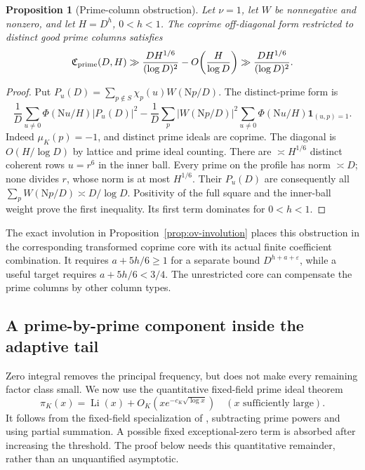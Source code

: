 \documentclass[11pt]{article}
\numberwithin{equation}{section}
\newtheorem{proposition}[theorem]{Proposition}
\theoremstyle{definition}
\theoremstyle{remark}
\newcommand{\N}{\mathrm N}
\newcommand{\muK}{\mu_K}
\newcommand{\ind}{\mathbf 1}
\newcommand{\eps}{\varepsilon}
\begin{document}
\begin{proposition}[Prime-column obstruction]\label{prop:prime-core}
Let \(\nu=1\), let \(W\) be nonnegative and nonzero, and let
\(H=D^h\), \(0<h<1\).
The coprime off-diagonal form restricted to distinct good prime
columns satisfies
\begin{equation}\label{eq:prime-core-lower}
 \mathfrak C_{\rm prime}(D,H)
 \gg \frac{DH^{1/6}}{(\log D)^2}-O\!\left(\frac H{\log D}\right)
 \gg \frac{DH^{1/6}}{(\log D)^2}.
\end{equation}
\end{proposition}
\begin{proof}
Put \(P_u(D)=\sum_{p\notin S}\chi_p(u)W(\N p/D)\).
The distinct-prime form is
\[
 \frac1D\sum_{u\ne0}\Phi(\N u/H)|P_u(D)|^2
 -\frac1D\sum_p|W(\N p/D)|^2
          \sum_{u\ne0}\Phi(\N u/H)\ind_{(u,p)=1}.
\]
Indeed \(\muK(p)=-1\), and distinct prime ideals are coprime.
The diagonal is \(O(H/\log D)\) by lattice and prime ideal counting.
There are \(\asymp H^{1/6}\) distinct coherent rows \(u=r^6\) in
the inner ball. Every prime on the profile has norm \(\asymp D\);
none divides \(r\), whose norm is at most \(H^{1/6}\).
Their \(P_u(D)\) are consequently all
\(\sum_pW(\N p/D)\asymp D/\log D\).
Positivity of the full square and the inner-ball weight prove the
first inequality. Its first term dominates for \(0<h<1\).
\end{proof}

The exact involution in Proposition~\ref{prop:ov-involution}
places this obstruction in the corresponding transformed coprime
core with its actual finite coefficient combination.
It requires \(a+5h/6\ge1\) for a separate bound
\(D^{h+a+\eps}\), while a useful target requires
\(a+5h/6<3/4\). The unrestricted core can compensate the prime
columns by other column types.

\subsection{A prime-by-prime component inside the adaptive tail}

Zero integral removes the principal frequency, but does not make
every remaining factor class small.
We now use the quantitative fixed-field prime ideal theorem
\begin{equation}\label{eq:quantitative-pnt}
 \pi_K(x)=\operatorname{Li}(x)
       +O_K(xe^{-c_K\sqrt{\log x}})
 \quad(x\text{ sufficiently large}).
\end{equation}
It follows from the fixed-field specialization of
\cite[Corollary~1.4]{DKN}, subtracting prime powers and using partial
summation. A possible fixed exceptional-zero term is absorbed after
increasing the threshold. The proof below needs this quantitative
remainder, rather than an unquantified asymptotic.
\end{document}
